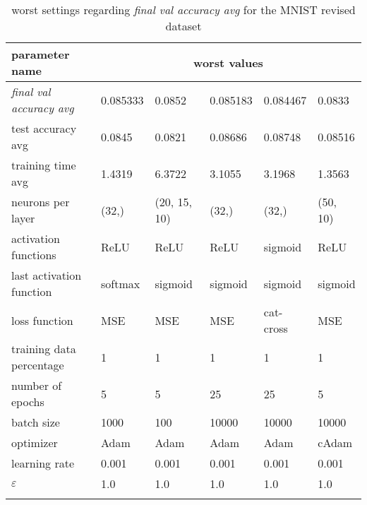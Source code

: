 \begin{longtable}{|l|l|l|l|l|>{\columncolor{worstColumnColor}}l|}
\hline
\textbf{parameter name} & \multicolumn{5}{c|}{\textbf{worst values}} \\
\hline
\textit{final val accuracy avg} & 0.085333 &  0.0852 & 0.085183 & 0.084467 &  0.0833 \\
test accuracy avg        & 0.0845  & 0.0821  & 0.08686 & 0.08748 & 0.08516 \\
training time avg        & 1.4319  & 6.3722  & 3.1055  & 3.1968  & 1.3563  \\
neurons per layer        & (32,)   & (20, 15, 10) & (32,)   & (32,)   & (50, 10) \\
activation functions     & ReLU    & ReLU    & ReLU    & sigmoid & ReLU    \\
last activation function & softmax & sigmoid & sigmoid & sigmoid & sigmoid \\
loss function            & MSE     & MSE     & MSE     & cat-cross & MSE     \\
{\color{equalParamColor} training data percentage } & {\color{equalParamColor} 1 } & {\color{equalParamColor} 1 } & {\color{equalParamColor} 1 } & {\color{equalParamColor} 1 } & {\color{equalParamColor} 1 } \\
number of epochs         & 5       & 5       & 25      & 25      & 5       \\
batch size               & 1000    & 100     & 10000   & 10000   & 10000   \\
optimizer                & Adam    & Adam    & Adam    & Adam    & cAdam   \\
{\color{equalParamColor} learning rate } & {\color{equalParamColor} 0.001 } & {\color{equalParamColor} 0.001 } & {\color{equalParamColor} 0.001 } & {\color{equalParamColor} 0.001 } & {\color{equalParamColor} 0.001 } \\
{\color{equalParamColor} $\varepsilon$ } & {\color{equalParamColor} 1.0 } & {\color{equalParamColor} 1.0 } & {\color{equalParamColor} 1.0 } & {\color{equalParamColor} 1.0 } & {\color{equalParamColor} 1.0 } \\
\hline

\caption{worst settings regarding \textit{final val accuracy avg} for the MNIST revised dataset}
\label{table:final_val_accuracy_avg_worst_mnist_revised}
\end{longtable}
